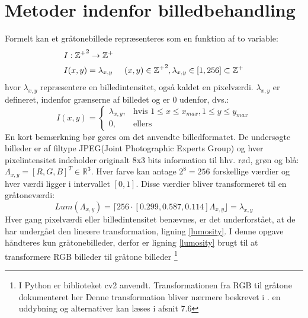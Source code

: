 \chapter{Metoder indenfor billedbehandling}\label{subsec:kant}
Formelt kan et gråtonebillede repræsenteres som en funktion af to variable:
\begin{equation}
\begin{split}
&I: \mathbb{\mathbb{Z^+}}^2 \rightarrow \mathbb{Z}^+ \\
&I(x,y) = \lambda_{x,y} \hspace{0.5 cm} (x,y)\in \mathbb{Z^+}^2, \lambda_{x,y} \in [1,256] \subset \mathbb{Z^+}
\end{split}
\label{bf}
\end{equation}
hvor $\lambda_{x,y}$ repræsentere en billedintensitet, også kaldet en pixelværdi. $\lambda_{x,y}$ er defineret, indenfor grænserne af billedet og er 0 udenfor, dvs.: 
\begin{equation}
 I(x, y) =
\begin{cases}
    \lambda_{x,y}, & \text{hvis } 1 \leq x \leq x_{max}, 1 \leq y \leq y_{max} \\
    0,              & \text{ellers}
    \label{pixelintensitet}
\end{cases}
\end{equation}
En kort bemærkning bør gøres om det anvendte billedformatet. De undersøgte billeder er af filtype JPEG(Joint Photographic Experts Group) og hver pixelintensitet indeholder originalt 8x3 bits information til hhv. rød, grøn og blå: $\Lambda_{x,y} = [R,G,B]^T \in \mathbb{R}^3$. Hver farve kan antage $2^8 = 256$ forskellige værdier og hver værdi ligger i intervallet $[0,1]$. Disse værdier bliver transformeret til en gråtoneværdi:
\begin{equation}
Lum(\Lambda_{x,y}) = \lceil	 256 \cdot [0.299, 0.587, 0.114] \Lambda_{x,y} \rfloor	 = \lambda_{x,y}
\label{lumosity}
\end{equation}  
Hver gang pixelværdi eller billedintensitet benævnes, er det underforstået, at de har undergået den lineære transformation, ligning \eqref{lumosity}. I denne opgave håndteres kun gråtonebilleder, derfor er ligning \eqref{lumosity} brugt til at transformere RGB billeder til gråtone billeder \footnote{I Python er biblioteket cv2 anvendt. Transformationen fra RGB til gråtone dokumenteret her %
Denne transformation bliver nærmere beskrevet i \cite{lumosity}. en uddybning og alternativer kan læses i afsnit 7.6} 
